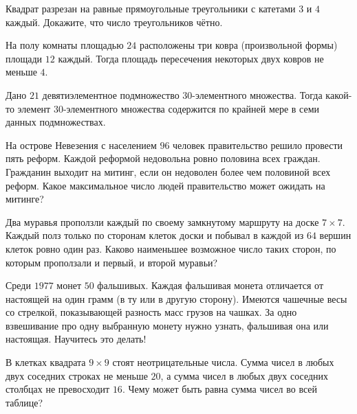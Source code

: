 \documentclass[12pt]{book}
\begin{document}
\begin{task}
Квадрат разрезан на равные прямоугольные треугольники с катетами $3$ и $4$ каждый. Докажите, что число треугольников чётно. 
\end{task}

\begin{task}
На полу комнаты площадью $24$ расположены три ковра (произвольной формы) площади $12$ каждый. Тогда площадь пересечения некоторых двух ковров не меньше $4$. 
\end{task}

\begin{task}
Дано $21$ девятиэлементное подмножество $30$-элементного множества. Тогда какой-то элемент $30$-элементного множества содержится по крайней мере в семи данных подмножествах.
\end{task}

\begin{task}
На острове Невезения с населением $96$ человек правительство решило провести пять реформ. Каждой реформой недовольна ровно половина всех граждан. Гражданин выходит на митинг, если он недоволен более чем половиной всех реформ. Какое максимальное число людей правительство может ожидать на митинге? 
\end{task}

\begin{task}
Два муравья проползли каждый по своему замкнутому маршруту на доске $7 \times 7$. Каждый полз только по сторонам клеток доски и побывал в каждой из $64$ вершин клеток ровно один раз. Каково наименьшее возможное число таких сторон, по которым проползали и первый, и второй муравьи?
\end{task}

\begin{task}
Среди $1977$ монет $50$ фальшивых. Каждая фальшивая монета отличается от настоящей на один грамм (в ту или в другую сторону). Имеются чашечные весы со стрелкой, показывающей разность масс грузов на чашках. За одно взвешивание про одну выбранную монету нужно узнать, фальшивая она или настоящая. Научитесь это делать!
\end{task}

\begin{task}
В клетках квадрата $9 \times 9$ стоят неотрицательные числа. Сумма чисел в любых двух соседних строках не меньше $20$, а сумма чисел в любых двух соседних столбцах не превосходит $16$. Чему может быть равна сумма чисел во всей таблице?
\end{task}
\end{document}
